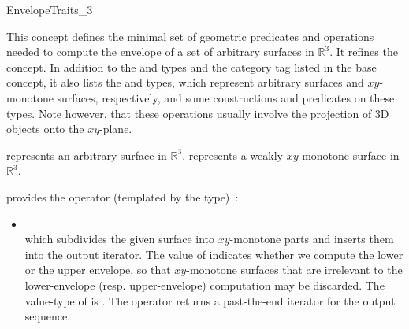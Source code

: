 \ccRefPageBegin

\begin{ccRefConcept}{EnvelopeTraits_3}

\ccDefinition

This concept defines the minimal set of geometric predicates and
operations needed to compute the envelope of a set of arbitrary
surfaces in $\mathbb{R}^3$. It refines the 
 concept. In addition to the
 and  types and the
 category tag listed in the base concept,
it also lists the  and  
types, which represent arbitrary surfaces and $xy$-monotone surfaces,
respectively, and some constructions and predicates on these types.
Note however, that these operations usually involve the projection of
3D objects onto the $xy$-plane.

\ccRefines
{}

\ccTypes

{represents an arbitrary surface in $\mathbb{R}^3$.}
\ccGlue
{}
{represents a weakly $xy$-monotone surface in $\mathbb{R}^3$.}


\ccThreeToTwo

{provides the operator (templated by the  type)~:
 \begin{itemize}
 \item {} \\
 which subdivides the given surface  into $xy$-monotone parts
 and inserts them into the output iterator. The value of
  indicates whether we compute the lower or the upper
 envelope, so that $xy$-monotone surfaces that are irrelevant to the
 lower-envelope (resp. upper-envelope) computation may be discarded.
 The value-type of  is .
 The operator returns a past-the-end iterator for the output sequence.
 \end{itemize}}


\end{ccRefConcept}
